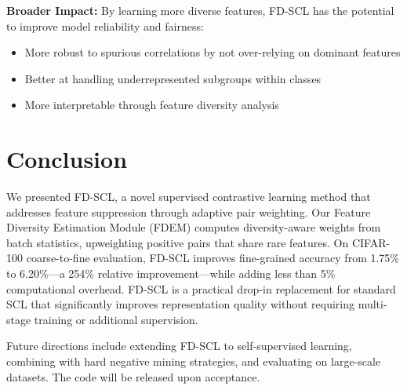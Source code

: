 \documentclass[11pt,a4paper]{article}
\begin{document}
\textbf{Broader Impact:} By learning more diverse features, FD-SCL has the potential to improve model reliability and fairness:
\begin{itemize}
    \item More robust to spurious correlations by not over-relying on dominant features
    \item Better at handling underrepresented subgroups within classes
    \item More interpretable through feature diversity analysis
\end{itemize}

\section{Conclusion}

We presented FD-SCL, a novel supervised contrastive learning method that addresses feature suppression through adaptive pair weighting. Our Feature Diversity Estimation Module (FDEM) computes diversity-aware weights from batch statistics, upweighting positive pairs that share rare features. On CIFAR-100 coarse-to-fine evaluation, FD-SCL improves fine-grained accuracy from 1.75\% to 6.20\%---a 254\% relative improvement---while adding less than 5\% computational overhead. FD-SCL is a practical drop-in replacement for standard SCL that significantly improves representation quality without requiring multi-stage training or additional supervision.

Future directions include extending FD-SCL to self-supervised learning, combining with hard negative mining strategies, and evaluating on large-scale datasets. The code will be released upon acceptance.
\end{document}
